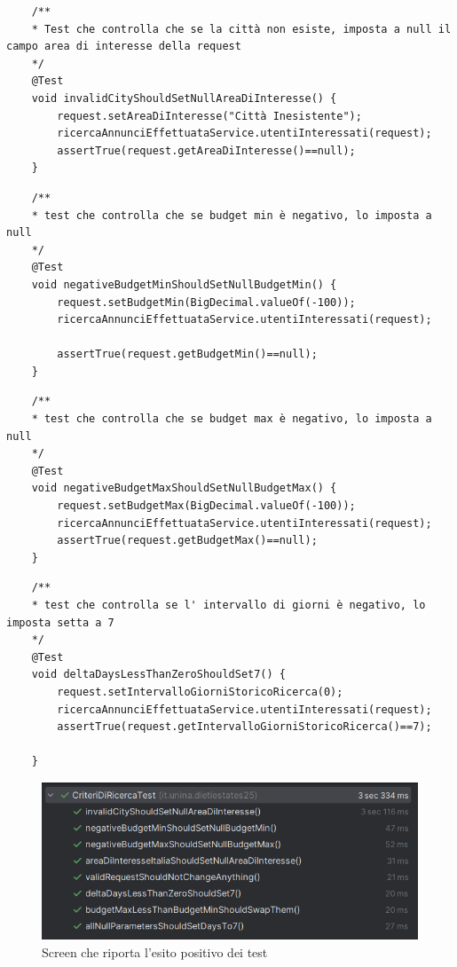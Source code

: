 \begin{lstlisting}
	/**
	* Test che controlla che se la città non esiste, imposta a null il campo area di interesse della request
	*/
	@Test
	void invalidCityShouldSetNullAreaDiInteresse() {
		request.setAreaDiInteresse("Città Inesistente");
		ricercaAnnunciEffettuataService.utentiInteressati(request);
		assertTrue(request.getAreaDiInteresse()==null);
	}
\end{lstlisting}

\begin{lstlisting}
	/**
	* test che controlla che se budget min è negativo, lo imposta a null
	*/
	@Test
	void negativeBudgetMinShouldSetNullBudgetMin() {
		request.setBudgetMin(BigDecimal.valueOf(-100));
		ricercaAnnunciEffettuataService.utentiInteressati(request);
		
		assertTrue(request.getBudgetMin()==null);
	}
\end{lstlisting}

\begin{lstlisting}
	/**
	* test che controlla che se budget max è negativo, lo imposta a null
	*/
	@Test
	void negativeBudgetMaxShouldSetNullBudgetMax() {
		request.setBudgetMax(BigDecimal.valueOf(-100));
		ricercaAnnunciEffettuataService.utentiInteressati(request);
		assertTrue(request.getBudgetMax()==null);
	}
\end{lstlisting}

\begin{lstlisting}
	/**
	* test che controlla se l' intervallo di giorni è negativo, lo imposta setta a 7
	*/
	@Test
	void deltaDaysLessThanZeroShouldSet7() {
		request.setIntervalloGiorniStoricoRicerca(0);
		ricercaAnnunciEffettuataService.utentiInteressati(request);
		assertTrue(request.getIntervalloGiorniStoricoRicerca()==7);
		
	}
\end{lstlisting}


\begin{figure}[H]
	\centering
	\includegraphics[width=0.7\linewidth]{Immagini/unit test/esitiTestUtentiInteressati.png}
	\caption[Esito test 2]{Screen che riporta l'esito positivo dei test}
\end{figure}
